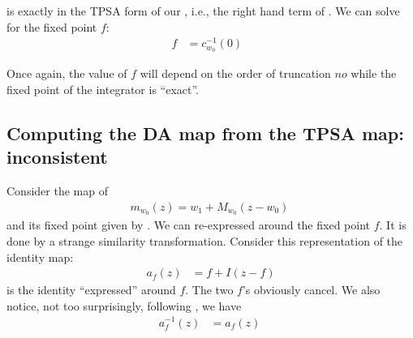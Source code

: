 \documentclass{hitec}     %
\begin{document}
{ is exactly in the TPSA form of our , i.e., the right hand term of .  We can solve for the fixed point $f$:
%
\begin{eqnarray}f&={c}_{{w}_{0}}^{-1}\left({0}\right)\ \ \ \label{eq:fp0}\end{eqnarray}
%

Once again, the value of $f$ will depend on the order of truncation $no$ while the fixed point of the integrator is ``exact''.

\subsection{Computing the DA map from the TPSA map: inconsistent}\label{s:dafromtpsa}

Consider the map of 
%
\begin{align} {m}_{{w}_{0}}\left({z}\right)={w}_{1}+{M}_{{w}_{0}}(z-{w}_{0})\ \label{eq:fpeqz} \end{align}
%
%
and its fixed point given by . We can re-expressed around the fixed point $f$. It is done by a strange similarity transformation. Consider this representation of the identity map:
%
\begin{align} {a}_{f}\left({z}\right)&=f+I\left({z-f}\right) \label{eq:idf}\end{align}
%
 is the identity ``expressed'' around $f$. The two $f$'s obviously cancel.  We also notice, not too surprisingly,  following  , we have 
%
\begin{align} {a}_{f}^{-1}\left({z}\right)&={a}_{f}\left({z}\right)\ \label{eq:ainv}\end{align}

}
\end{document}
